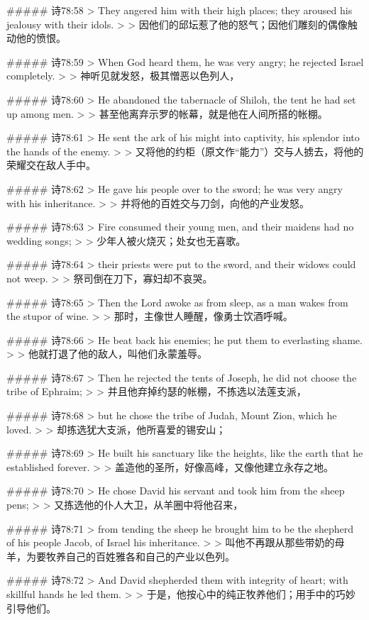 ##### 诗78:58
> They angered him with their high places; they aroused his jealousy with their idols.
>
> 因他们的邱坛惹了他的怒气；因他们雕刻的偶像触动他的愤恨。


##### 诗78:59
> When God heard them, he was very angry; he rejected Israel completely.
>
> 神听见就发怒，极其憎恶以色列人，


##### 诗78:60
> He abandoned the tabernacle of Shiloh, the tent he had set up among men.
>
> 甚至他离弃示罗的帐幕，就是他在人间所搭的帐棚。


##### 诗78:61
> He sent the ark of his might into captivity, his splendor into the hands of the enemy.
>
> 又将他的约柜（原文作“能力”）交与人掳去，将他的荣耀交在敌人手中。


##### 诗78:62
> He gave his people over to the sword; he was very angry with his inheritance.
>
> 并将他的百姓交与刀剑，向他的产业发怒。


##### 诗78:63
> Fire consumed their young men, and their maidens had no wedding songs;
>
> 少年人被火烧灭；处女也无喜歌。


##### 诗78:64
> their priests were put to the sword, and their widows could not weep.
>
> 祭司倒在刀下，寡妇却不哀哭。


##### 诗78:65
> Then the Lord awoke as from sleep, as a man wakes from the stupor of wine.
>
> 那时，主像世人睡醒，像勇士饮酒呼喊。


##### 诗78:66
> He beat back his enemies; he put them to everlasting shame.
>
> 他就打退了他的敌人，叫他们永蒙羞辱。


##### 诗78:67
> Then he rejected the tents of Joseph, he did not choose the tribe of Ephraim;
>
> 并且他弃掉约瑟的帐棚，不拣选以法莲支派，


##### 诗78:68
> but he chose the tribe of Judah, Mount Zion, which he loved.
>
> 却拣选犹大支派，他所喜爱的锡安山；


##### 诗78:69
> He built his sanctuary like the heights, like the earth that he established forever.
>
> 盖造他的圣所，好像高峰，又像他建立永存之地。


##### 诗78:70
> He chose David his servant and took him from the sheep pens;
>
> 又拣选他的仆人大卫，从羊圈中将他召来，


##### 诗78:71
> from tending the sheep he brought him to be the shepherd of his people Jacob, of Israel his inheritance.
>
> 叫他不再跟从那些带奶的母羊，为要牧养自己的百姓雅各和自己的产业以色列。


##### 诗78:72
> And David shepherded them with integrity of heart; with skillful hands he led them.
>
> 于是，他按心中的纯正牧养他们；用手中的巧妙引导他们。


